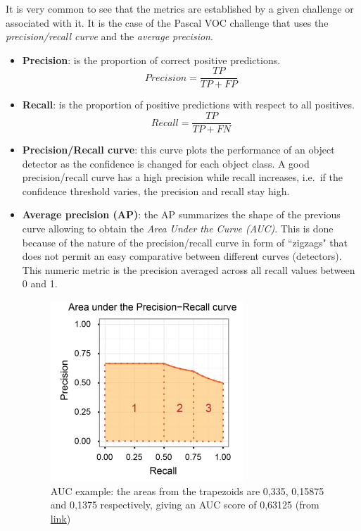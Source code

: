 It is very common to see that the metrics are established by a given challenge or associated with it. It is the case of the Pascal VOC challenge that uses the \textit{precision/recall curve} and the \textit{average precision}.\\
\begin{itemize}
    \item \textbf{Precision}: is the proportion of correct positive predictions.
    \begin{equation}
        Precision = \frac{TP}{TP + FP}
    \end{equation}
    \item \textbf{Recall}: is the proportion of positive predictions with respect to all positives.
    \begin{equation}
        Recall = \frac{TP}{TP + FN}
    \end{equation}
    \item \textbf{Precision/Recall curve}: this curve plots the performance of an object detector as the confidence is changed for each object class. A good precision/recall curve has a high precision while recall increases, i.e.\ if the confidence threshold varies, the precision and recall stay high.
    \item \textbf{Average precision (AP)}: the AP summarizes the shape of the previous curve allowing to obtain the \textit{Area Under the Curve (AUC)}. This is done because of the nature of the precision/recall curve in form of ``zigzags"  that does not permit an easy comparative between different curves (detectors). This numeric metric is the precision averaged across all recall values between 0 and 1.\\ 
    \begin{figure}[H]
    \begin{center}
    \includegraphics[scale=0.6]{figures/auc.png}
    \caption{AUC example: the areas from the trapezoids are 0,335, 0,15875 and 0,1375 respectively, giving an AUC score of 0,63125 (from \href{https://classeval.wordpress.com/introduction/introduction-to-the-precision-recall-plot/}{link})}

\end{center}
\end{figure}
\end{itemize}
